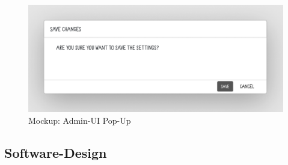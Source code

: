 \begin{figure}[H]
    \centering
    \includegraphics[width=\linewidth]{Images/Mockup_PopUp.png}
    \caption[Mockup: Admin-UI Pop-Up]{Mockup: Admin-UI Pop-Up}
\end{figure}

\subsection[Software-Design]{Software-Design}